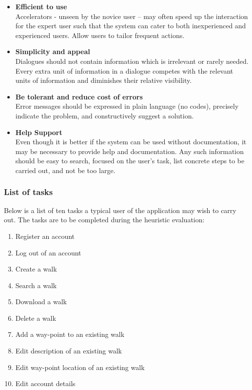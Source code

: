 \documentclass[11pt,a4paper]{article}
\begin{document}
\begin{itemize}
  \item \textbf{Efficient to use}\\ Accelerators - unseen by the novice user -- may often speed up the interaction for the expert user such that the system can cater to both inexperienced and experienced users. Allow users to tailor frequent actions.
  \item \textbf{Simplicity and appeal}\\ Dialogues should not contain information which is irrelevant or rarely needed. Every extra unit of information in a dialogue competes with the relevant units of information and diminishes their relative visibility.
  \item \textbf{Be tolerant and reduce cost of errors}\\ Error messages should be expressed in plain language (no codes), precisely indicate the problem, and constructively suggest a solution.
  \item \textbf{Help Support}\\ Even though it is better if the system can be used without documentation, it may be necessary to provide help and documentation. Any such information should be easy to search, focused on the user's task, list concrete steps to be carried out, and not be too large.
\end{itemize}

\subsubsection{List of tasks}

Below is a list of ten tasks a typical user of the application may wish to carry out. The tasks are to be completed during the heuristic evaluation:

\begin{enumerate}
  \item Register an account
  \item Log out of an account
  \item Create a walk
  \item Search a walk
  \item Download a walk
  \item Delete a walk
  \item Add a way-point to an existing walk
  \item Edit description of an existing walk
  \item Edit way-point location of an existing walk
  \item Edit account details
\end{enumerate}
\end{document}
